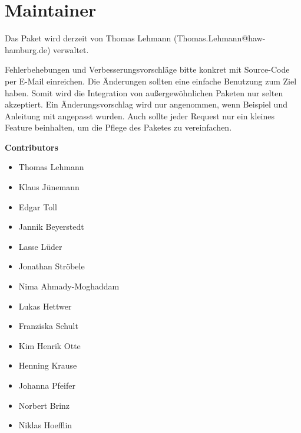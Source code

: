 %
\section{Maintainer}\label{sec:maintainer}
Das Paket wird derzeit von Thomas Lehmann (Thomas.Lehmann@haw-hamburg.de) verwaltet.

Fehlerbehebungen und Verbesserungsvorschläge bitte konkret mit Source-Code per E-Mail einreichen. Die Änderungen sollten eine einfache Benutzung zum Ziel haben.  Somit wird die Integration von außergewöhnlichen Paketen nur selten akzeptiert.  Ein Änderungsvorschlag wird nur angenommen,  wenn Beispiel und Anleitung mit angepasst wurden. Auch sollte jeder Request nur ein kleines Feature beinhalten,  um die Pflege des Paketes zu vereinfachen.

\textbf{Contributors}
\begin{itemize}
\item Thomas Lehmann
\item Klaus Jünemann
\item Edgar Toll
\item Jannik Beyerstedt
\item Lasse Lüder
\item Jonathan Ströbele
\item Nima Ahmady-Moghaddam	
\item Lukas Hettwer
\item Franziska Schult
\item Kim Henrik Otte
\item Henning Krause
\item Johanna Pfeifer
\item Norbert Brinz
\item Niklas Hoefflin
\end{itemize}
